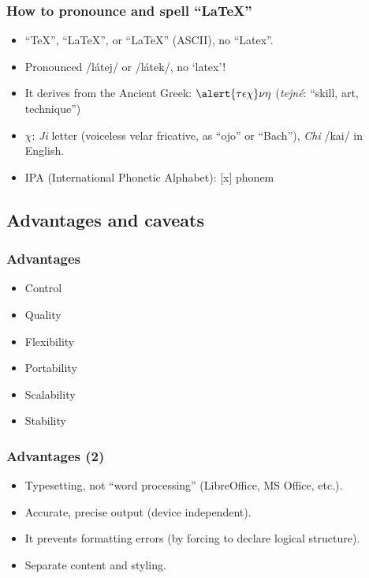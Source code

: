 \documentclass{beamer}
\begin{document}

\begin{frame}
\frametitle{How to pronounce and spell ``\LaTeX''}

\begin{itemize}

\item ``\TeX'', ``\LaTeX'', or ``LaTeX'' (ASCII), no ``Latex''.
\item Pronounced /látej/ or /látek/, no `latex'! 
\item It derives from the Ancient Greek: $\alert{\tau\epsilon\chi}\nu\eta$ (\textit{\alert{tej}né}: ``skill, art, technique'')
\item $\chi$: \textit{Ji} letter (voiceless velar fricative, as ``ojo'' or ``Bach''), \textit{Chi} /kai/ in English.
\item IPA (International Phonetic Alphabet): [x] phonem 
\end{itemize}

\end{frame}

\subsection{Advantages and caveats}

\begin{frame}
\frametitle{Advantages}

\begin{itemize}
\item Control
\item Quality
\item Flexibility
\item Portability
\item Scalability
\item Stability
\end{itemize}

\end{frame}



\begin{frame}
\frametitle{Advantages (2)}

\begin{itemize}
\item Typesetting, not ``word processing'' (LibreOffice, MS Office, etc.).
\item Accurate, precise output (device independent).
\item It prevents formatting errors (by forcing to declare logical structure).
\item Separate content and styling.
\end{itemize}

\end{frame}
\end{document}
